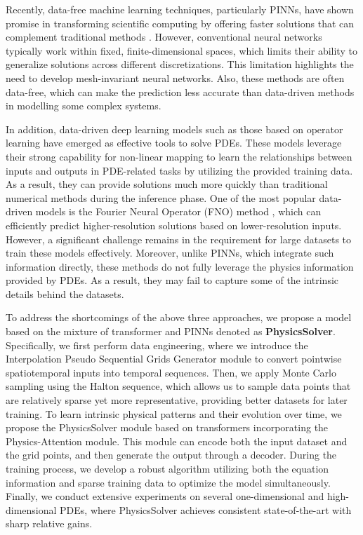 \documentclass[preprint,11pt]{elsarticle}
\begin{document}
Recently, data-free machine learning techniques, particularly PINNs, have shown promise in transforming scientific computing by offering faster solutions that can complement traditional methods \cite{raissi2019physics}. However, conventional neural networks typically work within fixed, finite-dimensional spaces, which limits their ability to generalize solutions across different discretizations. This limitation highlights the need to develop mesh-invariant neural networks. Also, these methods are often data-free, which can make the prediction less accurate than data-driven methods in modelling some complex systems.

In addition, data-driven deep learning models such as those based on operator learning have emerged as effective tools to solve PDEs. These models leverage their strong capability for non-linear mapping to learn the relationships between inputs and outputs in PDE-related tasks by utilizing the provided training data. As a result, they can provide solutions much more quickly than traditional numerical methods during the inference phase. One of the most popular data-driven models is the Fourier Neural Operator (FNO) method \cite{li2020fourier}, which can efficiently predict higher-resolution solutions based on lower-resolution inputs. However, a significant challenge remains in the requirement for large datasets to train these models effectively. Moreover, unlike PINNs, which integrate such information directly, these methods do not fully leverage the physics information provided by PDEs. As a result, they may fail to capture some of the intrinsic details behind the datasets.

To address the shortcomings of the above three approaches, we propose a model based on the mixture of transformer and PINNs denoted as \textbf{PhysicsSolver}. Specifically, we first perform data engineering, where we introduce the Interpolation Pseudo Sequential Grids Generator module to convert pointwise spatiotemporal inputs into temporal sequences. Then, we apply Monte Carlo sampling using the Halton sequence, which allows us to sample data points that are relatively sparse yet more representative, providing better datasets for later training. To learn intrinsic physical patterns and their evolution over time, we propose the PhysicsSolver module based on transformers incorporating the Physics-Attention module. This module can encode both the input dataset and the grid points, and then generate the output through a decoder. During the training process, we develop a robust algorithm utilizing both the equation information and sparse training data to optimize the model simultaneously. Finally, we conduct extensive experiments on several one-dimensional and high-dimensional PDEs, where PhysicsSolver achieves consistent state-of-the-art with sharp relative gains. 
\end{document}
